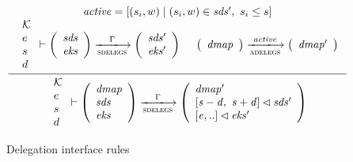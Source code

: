 \begin{figure}
  \begin{equation}
    \label{eq:rule:delegation-interface}
    \inference
    {\var{active} = [(s_i, w) \mid (s_i, w) \in \var{sds'},~ s_i \leq s]\\
      {\begin{array}{l}
         \mathcal{K} \\
         e\\
         s\\
         d
       \end{array}}
      \vdash
      {
        \left(
          \begin{array}{l}
            \var{sds}\\
            \var{eks}
          \end{array}
        \right)
      }
      \trans{sdelegs}{\Gamma}
      {
        \left(
          \begin{array}{l}
            \var{sds'}\\
            \var{eks'}
          \end{array}
        \right)
      }
      &
      {
        \left(
          \begin{array}{l}
            \var{dmap}
          \end{array}
        \right)
      }
      \trans{adelegs}{\var{active}}
      {
        \left(
          \begin{array}{l}
            \var{dmap'}\\
          \end{array}
        \right)
      }      
    }    
    {
      {\begin{array}{l}
         \mathcal{K} \\
         e\\
         s\\
         d
      \end{array}}
      \vdash
      {
        \left(
          \begin{array}{l}
            \var{dmap}\\
            \var{sds}\\
            \var{eks}
          \end{array}
        \right)
      }
      \trans{sdelegs}{\Gamma}
      {
        \left(
          \begin{array}{l}
            \var{dmap'}\\
            \var{[s-d,~ s+d]} \restrictdom \var{sds'}\\
            \var{[e, ..]} \restrictdom \var{eks'}
          \end{array}
        \right)
      }      
    }
  \end{equation}
  \caption{Delegation interface rules}
  \label{fig:rules:delegation-interface}
\end{figure}

